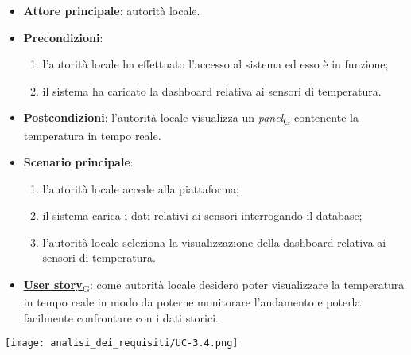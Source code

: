 \begin{itemize}
	\item \textbf{Attore principale}: autorità locale.
	\item \textbf{Precondizioni}:
	      \begin{enumerate}
		      \item l'autorità locale ha effettuato l'accesso al sistema ed esso è in funzione;
		      \item il sistema ha caricato la dashboard relativa ai sensori di temperatura.
	      \end{enumerate}
	\item \textbf{Postcondizioni}: l'autorità locale visualizza un \href{https://7last.github.io/docs/rtb/documentazione-interna/glossario\#panel}{\textit{panel}\textsubscript{G}} contenente la temperatura in tempo reale.
	\item \textbf{Scenario principale}:
	      \begin{enumerate}
		      \item l'autorità locale accede alla piattaforma;
		      \item il sistema carica i dati relativi ai sensori interrogando il database;
		      \item l'autorità locale seleziona la visualizzazione della dashboard relativa ai sensori di temperatura.
	      \end{enumerate}
	\item \href{https://7last.github.io/docs/rtb/documentazione-interna/glossario\#user-story}{\textbf{User story}\textsubscript{G}}:
	      come autorità locale desidero poter visualizzare la temperatura in tempo reale in modo da poterne monitorare l'andamento
	      e poterla facilmente confrontare con i dati storici.
\end{itemize}
\begin{center}
	\texttt{[image: analisi\_dei\_requisiti/UC-3.4.png]}
\end{center}


